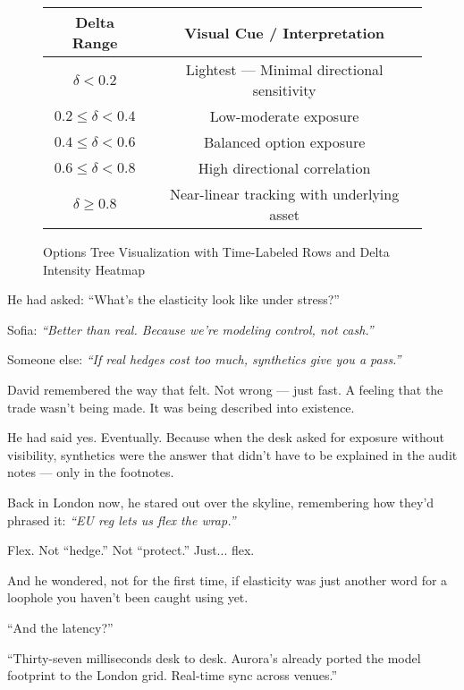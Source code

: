 \begin{figure}[H]
    \begin{tabular}{|c|c|}
      \hline
      \textbf{Delta Range} & \textbf{Visual Cue / Interpretation} \\
      \hline
      $\delta < 0.2$ & \cellcolor{black!5} Lightest — Minimal directional sensitivity \\
      $0.2 \leq \delta < 0.4$ & \cellcolor{red!20} Low-moderate exposure \\
      $0.4 \leq \delta < 0.6$ & \cellcolor{red!40} Balanced option exposure \\
      $0.6 \leq \delta < 0.8$ & \cellcolor{red!60} High directional correlation \\
      $\delta \geq 0.8$ & \cellcolor{red!80} Near-linear tracking with underlying asset \\
      \hline
    \end{tabular}
  
    \caption{Options Tree Visualization with Time-Labeled Rows and Delta Intensity Heatmap}
\end{figure}



\medskip


He had asked:
“What's the elasticity look like under stress?”

Sofia:
\textit{“Better than real. Because we’re modeling control, not cash.”}

Someone else:
\textit{“If real hedges cost too much, synthetics give you a pass.”}

David remembered the way that felt. Not wrong — just fast.
A feeling that the trade wasn't being made. It was being described into existence.

He had said yes. Eventually.
Because when the desk asked for exposure without visibility,
synthetics were the answer that didn’t have to be explained in the audit notes —
only in the footnotes.

\medskip

Back in London now, he stared out over the skyline,
remembering how they’d phrased it:
\textit{“EU reg lets us flex the wrap.”}

Flex. Not “hedge.” Not “protect.”
Just... flex.

And he wondered, not for the first time,
if elasticity was just another word for a loophole
you haven't been caught using yet.


“And the latency?”

“Thirty-seven milliseconds desk to desk. Aurora’s already ported the model footprint to the London grid. 
Real-time sync across venues.”

